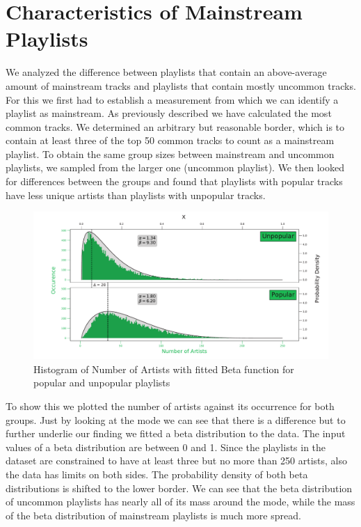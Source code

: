 \section{Characteristics of Mainstream Playlists}
We analyzed the difference between playlists that contain an above-average amount of mainstream tracks and playlists that contain mostly uncommon tracks. For this we first had to establish a measurement from which we can identify a playlist as mainstream. As previously described we have calculated the most common tracks. We determined an arbitrary but reasonable border, which is to contain at least three of the top 50 common tracks to count as a mainstream playlist. To obtain the same group sizes between mainstream and uncommon playlists, we sampled from the larger one (uncommon playlist). We then looked for differences between the groups and found that playlists with popular tracks have less unique artists than playlists with unpopular tracks. 

\begin{figure}[ht]
    \centering
    \includegraphics[width=\textwidth]{fig/pop_unpop_artist.pdf}
    \caption{Histogram of Number of Artists with fitted Beta function for popular and unpopular playlists}
    \label{fig:pop_unppo_artist}
\end{figure}

To show this we plotted the number of artists against its occurrence for both groups. Just by looking at the mode we can see that there is a difference but to further underlie our finding we fitted a beta distribution to the data. The input values of a beta distribution are between 0 and 1. Since the playlists in the dataset are constrained to have at least three but no more than 250 artists, also the data has limits on both sides. The probability density of both beta distributions is shifted to the lower border. We can see that the beta distribution of uncommon playlists has nearly all of its mass around the mode, while the mass of the beta distribution of mainstream playlists is much more spread.

